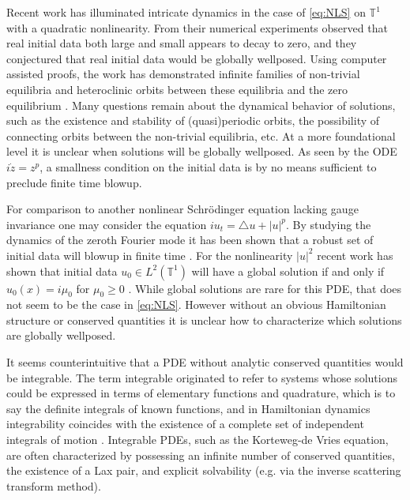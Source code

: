 \documentclass{article}
\newcommand{\T}{\mathbb{T}}
\begin{document}
Recent work has  illuminated intricate dynamics in the case of \eqref{eq:NLS} on $\T^1$ with a quadratic nonlinearity. 
From their numerical experiments \cite{Cho2016} observed that real initial data both large and small appears to decay to zero, and they conjectured that real initial data would be globally wellposed.   
Using computer assisted proofs, the work \cite{jaquette2020global}  has demonstrated infinite families of non-trivial equilibria and heteroclinic orbits between these equilibria and the zero equilibrium \cite{jaquette2020global}. 
Many questions remain about the   dynamical behavior of solutions, such as the existence and stability of (quasi)periodic orbits, the possibility of connecting orbits between the non-trivial equilibria, etc. 
At a more foundational level it is unclear when solutions will be globally wellposed. As seen by the ODE $i \dot{z} = z^p$, a smallness condition on the initial data  is by no means sufficient to preclude finite time blowup. 



For comparison to another nonlinear Schr\"odinger equation lacking gauge invariance one may consider the equation $ i u_t = \triangle u + |u|^p$. 
By studying the dynamics of the zeroth Fourier mode it has been shown that a robust set of initial data will blowup in finite time
\cite{oh2012blowup,ikeda2015some,fujiwara2017lifespan}.  For the nonlinearity $|u|^2$   recent work has shown that initial data $u_0 \in L^2(\T^1)$ will have a global solution if and only if $ u_0(x) = i \mu_0 $ for $\mu_0 \geq 0$ \cite{fujiwara2020necessary}. 
While global solutions are rare for this PDE, that does not seem to be the case in \eqref{eq:NLS}. 
However without an obvious Hamiltonian structure or conserved quantities it is unclear how to characterize which solutions are globally wellposed.  

It seems counterintuitive that a PDE without analytic conserved quantities would be integrable. 
The term integrable originated to refer to systems whose solutions could be expressed in terms of elementary functions and quadrature, which is to say the definite integrals of known functions, and in Hamiltonian dynamics integrability  coincides with the existence of a complete set of independent integrals of motion \cite{kozlov1983integrability,ramani1989painleve}. 
Integrable PDEs, such as the Korteweg-de Vries equation, are often characterized by possessing an infinite number of conserved quantities, the existence of a Lax pair, and  explicit solvability (e.g. via the inverse scattering transform method). 
\end{document}
